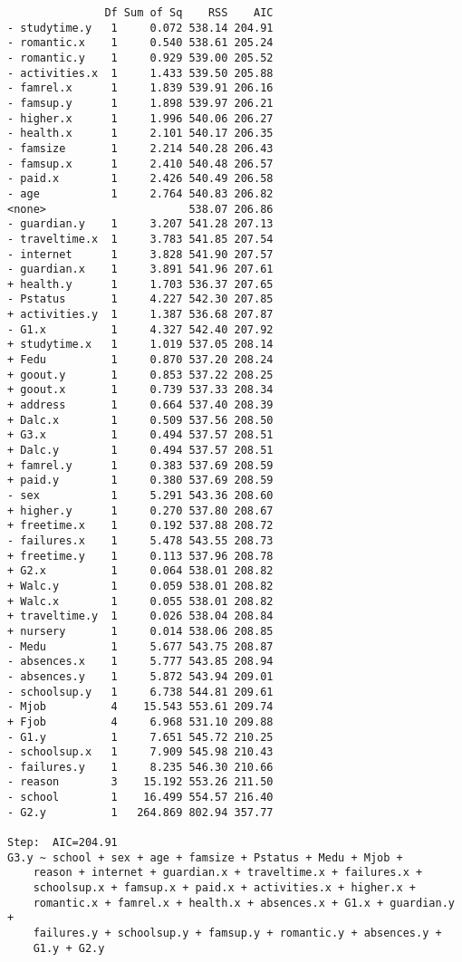 \documentclass[11pt]{article}
\begin{document}
\begin{enumerate}
\begin{verbatim}
               Df Sum of Sq    RSS    AIC
- studytime.y   1     0.072 538.14 204.91
- romantic.x    1     0.540 538.61 205.24
- romantic.y    1     0.929 539.00 205.52
- activities.x  1     1.433 539.50 205.88
- famrel.x      1     1.839 539.91 206.16
- famsup.y      1     1.898 539.97 206.21
- higher.x      1     1.996 540.06 206.27
- health.x      1     2.101 540.17 206.35
- famsize       1     2.214 540.28 206.43
- famsup.x      1     2.410 540.48 206.57
- paid.x        1     2.426 540.49 206.58
- age           1     2.764 540.83 206.82
<none>                      538.07 206.86
- guardian.y    1     3.207 541.28 207.13
- traveltime.x  1     3.783 541.85 207.54
- internet      1     3.828 541.90 207.57
- guardian.x    1     3.891 541.96 207.61
+ health.y      1     1.703 536.37 207.65
- Pstatus       1     4.227 542.30 207.85
+ activities.y  1     1.387 536.68 207.87
- G1.x          1     4.327 542.40 207.92
+ studytime.x   1     1.019 537.05 208.14
+ Fedu          1     0.870 537.20 208.24
+ goout.y       1     0.853 537.22 208.25
+ goout.x       1     0.739 537.33 208.34
+ address       1     0.664 537.40 208.39
+ Dalc.x        1     0.509 537.56 208.50
+ G3.x          1     0.494 537.57 208.51
+ Dalc.y        1     0.494 537.57 208.51
+ famrel.y      1     0.383 537.69 208.59
+ paid.y        1     0.380 537.69 208.59
- sex           1     5.291 543.36 208.60
+ higher.y      1     0.270 537.80 208.67
+ freetime.x    1     0.192 537.88 208.72
- failures.x    1     5.478 543.55 208.73
+ freetime.y    1     0.113 537.96 208.78
+ G2.x          1     0.064 538.01 208.82
+ Walc.y        1     0.059 538.01 208.82
+ Walc.x        1     0.055 538.01 208.82
+ traveltime.y  1     0.026 538.04 208.84
+ nursery       1     0.014 538.06 208.85
- Medu          1     5.677 543.75 208.87
- absences.x    1     5.777 543.85 208.94
- absences.y    1     5.872 543.94 209.01
- schoolsup.y   1     6.738 544.81 209.61
- Mjob          4    15.543 553.61 209.74
+ Fjob          4     6.968 531.10 209.88
- G1.y          1     7.651 545.72 210.25
- schoolsup.x   1     7.909 545.98 210.43
- failures.y    1     8.235 546.30 210.66
- reason        3    15.192 553.26 211.50
- school        1    16.499 554.57 216.40
- G2.y          1   264.869 802.94 357.77

Step:  AIC=204.91
G3.y ~ school + sex + age + famsize + Pstatus + Medu + Mjob + 
    reason + internet + guardian.x + traveltime.x + failures.x + 
    schoolsup.x + famsup.x + paid.x + activities.x + higher.x + 
    romantic.x + famrel.x + health.x + absences.x + G1.x + guardian.y + 
    failures.y + schoolsup.y + famsup.y + romantic.y + absences.y + 
    G1.y + G2.y


\end{verbatim}
\end{enumerate}
\end{document}
